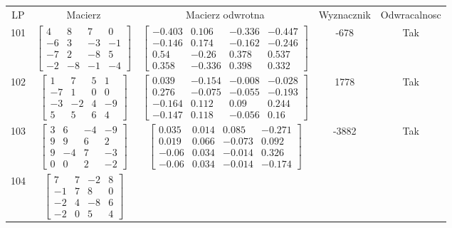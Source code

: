 \documentclass[a4paper,12pt]{article}
\begin{document}
\bgroup {} \vspace{0.2in} \begin{tabular}{c c c c c}
LP & Macierz & Macierz odwrotna & Wyznacznik & Odwracalnosc\\
101
&
$\begin{bmatrix} 4 & 8 & 7 & 0 \\ -6 & 3 & -3 & -1 \\ -7 & 2 & -8 & 5 \\ -2 & -8 & -1 & -4 \end{bmatrix}$
&
$\begin{bmatrix} -0.403 & 0.106 & -0.336 & -0.447 \\ -0.146 & 0.174 & -0.162 & -0.246 \\ 0.54 & -0.26 & 0.378 & 0.537 \\ 0.358 & -0.336 & 0.398 & 0.332 \end{bmatrix}$
&
-678
&
Tak
\\
102
&
$\begin{bmatrix} 1 & 7 & 5 & 1 \\ -7 & 1 & 0 & 0 \\ -3 & -2 & 4 & -9 \\ 5 & 5 & 6 & 4 \end{bmatrix}$
&
$\begin{bmatrix} 0.039 & -0.154 & -0.008 & -0.028 \\ 0.276 & -0.075 & -0.055 & -0.193 \\ -0.164 & 0.112 & 0.09 & 0.244 \\ -0.147 & 0.118 & -0.056 & 0.16 \end{bmatrix}$
&
1778
&
Tak
\\
103
&
$\begin{bmatrix} 3 & 6 & -4 & -9 \\ 9 & 9 & 6 & 2 \\ 9 & -4 & 7 & -3 \\ 0 & 0 & 2 & -2 \end{bmatrix}$
&
$\begin{bmatrix} 0.035 & 0.014 & 0.085 & -0.271 \\ 0.019 & 0.066 & -0.073 & 0.092 \\ -0.06 & 0.034 & -0.014 & 0.326 \\ -0.06 & 0.034 & -0.014 & -0.174 \end{bmatrix}$
&
-3882
&
Tak
\\
104
&
$\begin{bmatrix} 7 & 7 & -2 & 8 \\ -1 & 7 & 8 & 0 \\ -2 & 4 & -8 & 6 \\ -2 & 0 & 5 & 4 \end{bmatrix}$

\end{tabular}
\end{document}
